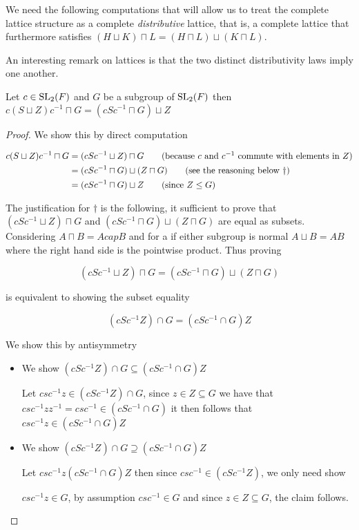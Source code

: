We need the following computations that will allow us to treat the complete lattice structure as a complete \textit{distributive} lattice, that is, a complete lattice that
furthermore satisfies $(H \sqcup K) \sqcap L = (H \sqcap L) \sqcup (K \sqcap L)$. 

An interesting remark on lattices is that the two distinct distributivity laws imply one another.


\begin{lemma}
  \label{MaximalAbelianSubgroup.conj_S_join_Z_meet_G_eq_conj_S_meet_G_join_Z}
  \leanok
  Let $c \in \operatorname{SL}_2(F)$  and $G$ be a subgroup of $\operatorname{SL}_2(F)$ then $c(S \sqcup Z)c^{-1} \sqcap G = (cSc^{-1} \sqcap G) \sqcup Z$
\end{lemma}
\begin{proof}
  \leanok
We show this by direct computation

\begin{align*}
  c(S \sqcup Z)c^{-1} \sqcap G &= (cSc^{-1} \sqcup Z) \sqcap G \tag{because $c$ and $c^{-1}$ commute with elements in $Z$}\\
   &= (cSc^{-1} \sqcap G) \sqcup (Z \sqcap G) \tag{see the reasoning below $\dagger$}\\
   &= (cSc^{-1} \sqcap G) \sqcup Z \tag{since $Z \le G$}
\end{align*}

The justification for $\dagger$ is the following, it sufficient to prove that $(cSc^{-1} \sqcup Z) \sqcap G$
and $(cSc^{-1} \sqcap G) \sqcup (Z \sqcap G)$ are equal as subsets. Considering $A \sqcap B = A cap B$ and for a if either subgroup is normal
$A \sqcup B = AB$ where the right hand side is the pointwise product. Thus proving

\[
  (cSc^{-1} \sqcup Z) \sqcap G = (cSc^{-1} \sqcap G) \sqcup (Z \sqcap G)
\]

is equivalent to showing the subset equality 

\[
(cSc^{-1}Z) \cap G = (cSc^{-1} \cap G)Z
\]

We show this by antisymmetry

\begin{itemize}
  \item We show $(cSc^{-1}Z) \cap G \subseteq (cSc^{-1} \cap G)Z$
  
  Let $csc^{-1}z \in (cSc^{-1}Z) \cap G$, since $z \in Z \subseteq G$ we have that $csc^{-1}zz^{-1} = csc^{-1} \in (cSc^{-1} \cap G)$
  it then follows that $csc^{-1}z \in (cSc^{-1} \cap G)Z$

  
  \item We show $(cSc^{-1}Z) \cap G \supseteq (cSc^{-1} \cap G)Z$
  
  Let $csc^{-1}z (cSc^{-1} \cap G)Z$ then since $csc^{-1} \in (cSc^{-1}Z)$, we only need show

  $csc^{-1}z \in G$, by assumption $csc^{-1} \in G$ and since $z \in Z\subseteq G$, the claim follows.  
\end{itemize}
\end{proof}
